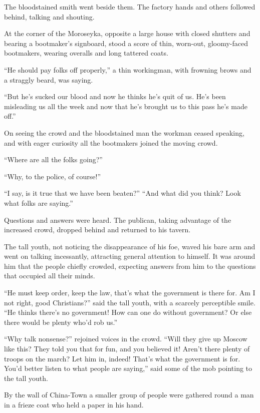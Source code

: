 The bloodstained smith went beside them. The factory hands and
others followed behind, talking and shouting.

At the corner of the Moroseyka, opposite a large house with
closed shutters and bearing a bootmaker's signboard, stood a
score of thin, worn-out, gloomy-faced bootmakers, wearing
overalls and long tattered coats.

``He should pay folks off properly,'' a thin workingman, with
frowning brows and a straggly beard, was saying.

``But he's sucked our blood and now he thinks he's quit of
us. He's been misleading us all the week and now that he's
brought us to this pass he's made off.''

On seeing the crowd and the bloodstained man the workman ceased
speaking, and with eager curiosity all the bootmakers joined the
moving crowd.

``Where are all the folks going?''

``Why, to the police, of course!''

``I say, is it true that we have been beaten?'' ``And what did
you think?  Look what folks are saying.''

Questions and answers were heard. The publican, taking advantage
of the increased crowd, dropped behind and returned to his
tavern.

The tall youth, not noticing the disappearance of his foe, waved
his bare arm and went on talking incessantly, attracting general
attention to himself. It was around him that the people chiefly
crowded, expecting answers from him to the questions that
occupied all their minds.

``He must keep order, keep the law, that's what the government is
there for. Am I not right, good Christians?'' said the tall
youth, with a scarcely perceptible smile. ``He thinks there's no
government! How can one do without government? Or else there
would be plenty who'd rob us.''

``Why talk nonsense?'' rejoined voices in the crowd. ``Will they
give up Moscow like this? They told you that for fun, and you
believed it!  Aren't there plenty of troops on the march? Let him
in, indeed! That's what the government is for. You'd better
listen to what people are saying,'' said some of the mob pointing
to the tall youth.

By the wall of China-Town a smaller group of people were gathered
round a man in a frieze coat who held a paper in his hand.

